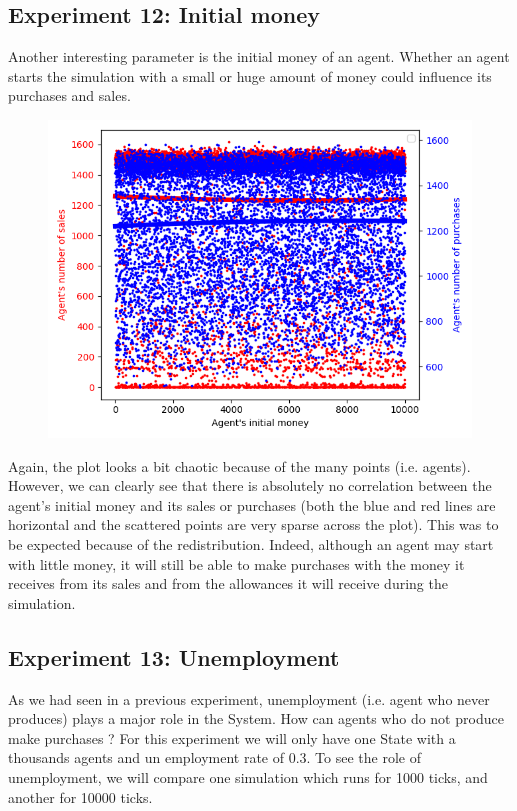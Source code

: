 {{{{{{{{{{{{        \par


    \subsection{Experiment 12: Initial money}
    Another interesting parameter is the initial money of an agent. Whether an agent starts the simulation with a small or huge amount of money could influence its purchases and sales. 

        \begin{figure}
            \includegraphics[width=\linewidth]{img/exp/12_1.png}
        \end{figure} 
        { Again, the plot looks a bit chaotic because of the many points (i.e. agents). However, we can clearly see that there is absolutely no correlation between the agent's initial money and its sales or purchases (both the blue and red lines are horizontal and the scattered points are very sparse across the plot). This was to be expected because of the redistribution. Indeed, although an agent may start with little money, it will still be able to make purchases with the money it receives from its sales and from the allowances it will receive during the simulation. 
        \par



    \subsection{Experiment 13: Unemployment}
    As we had seen in a previous experiment, unemployment (i.e. agent who never produces) plays a major role in the System. How can agents who do not produce make purchases ? For this experiment we will only have one State with a thousands agents and un employment rate of 0.3. To see the role of unemployment, we will compare one simulation which runs for 1000 ticks, and another for 10000 ticks.

}}}}}}}}}}}}}
